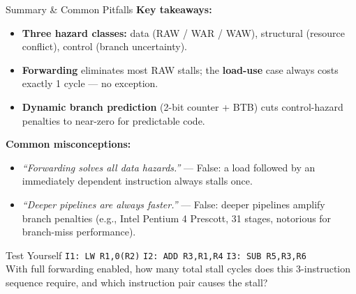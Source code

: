 \documentclass{beamer}
\begin{document}
\begin{frame}{Summary \& Common Pitfalls}
  \textbf{Key takeaways:}
  \begin{itemize}
    \item \textbf{Three hazard classes:} data (RAW / WAR / WAW), structural
          (resource conflict), control (branch uncertainty).
    \item \textbf{Forwarding} eliminates most RAW stalls; the
          \textbf{load-use} case always costs exactly 1 cycle --- no exception.
    \item \textbf{Dynamic branch prediction} (2-bit counter + BTB) cuts
          control-hazard penalties to near-zero for predictable code.
  \end{itemize}

  \smallskip
  \textbf{Common misconceptions:}
  \begin{itemize}
    \item \textit{``Forwarding solves all data hazards.''} --- False: a load
          followed by an immediately dependent instruction always stalls once.
    \item \textit{``Deeper pipelines are always faster.''} --- False: deeper
          pipelines amplify branch penalties (e.g., Intel Pentium 4 Prescott,
          31 stages, notorious for branch-miss performance).
  \end{itemize}

  \begin{alertblock}{Test Yourself}
    \small \texttt{I1: LW~R1,0(R2)} \enspace \texttt{I2: ADD~R3,R1,R4}
    \enspace \texttt{I3: SUB~R5,R3,R6} \\
    With full forwarding enabled, how many total stall cycles does this
    3-instruction sequence require, and which instruction pair causes the stall?
  \end{alertblock}
\end{frame}
\end{document}
